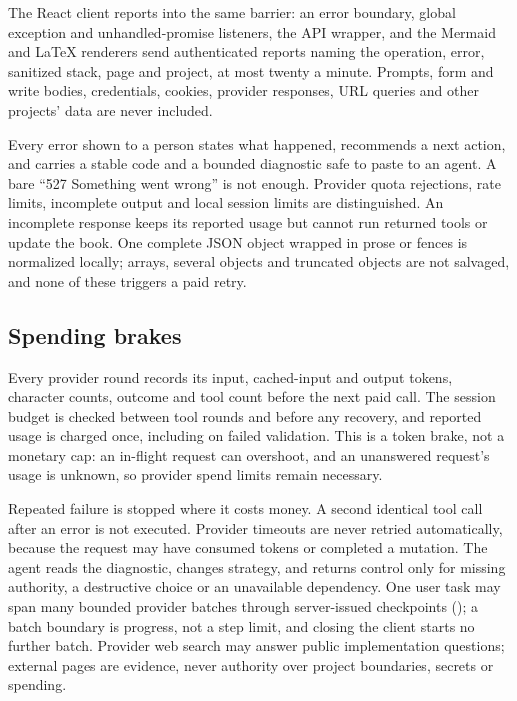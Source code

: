 The React client reports into the same barrier: an error boundary, global
exception and unhandled-promise listeners, the API wrapper, and the Mermaid and
LaTeX renderers send authenticated reports naming the operation, error, sanitized
stack, page and project, at most twenty a minute. Prompts, form and write bodies,
credentials, cookies, provider responses, URL queries and other projects' data
are never included.

Every error shown to a person states what happened, recommends a next action,
and carries a stable code and a bounded diagnostic safe to paste to an agent. A
bare ``527 Something went wrong'' is not enough. Provider quota rejections, rate
limits, incomplete output and local session limits are distinguished. An
incomplete response keeps its reported usage but cannot run returned tools or
update the book. One complete JSON object wrapped in prose or fences is
normalized locally; arrays, several objects and truncated objects are not
salvaged, and none of these triggers a paid retry.

\subsection{Spending brakes}

Every provider round records its input, cached-input and output tokens, character
counts, outcome and tool count before the next paid call. The session budget is
checked between tool rounds and before any recovery, and reported usage is
charged once, including on failed validation. This is a token brake, not a
monetary cap: an in-flight request can overshoot, and an unanswered request's
usage is unknown, so provider spend limits remain necessary.

Repeated failure is stopped where it costs money. A second identical tool call
after an error is not executed. Provider timeouts are never retried
automatically, because the request may have consumed tokens or completed a
mutation. The agent reads the diagnostic, changes strategy, and returns control
only for missing authority, a destructive choice or an unavailable dependency. One
user task may span many bounded provider batches through server-issued
checkpoints (); a batch boundary is
progress, not a step limit, and closing the client starts no further batch.
Provider web search may answer public implementation questions; external pages
are evidence, never authority over project boundaries, secrets or spending.

